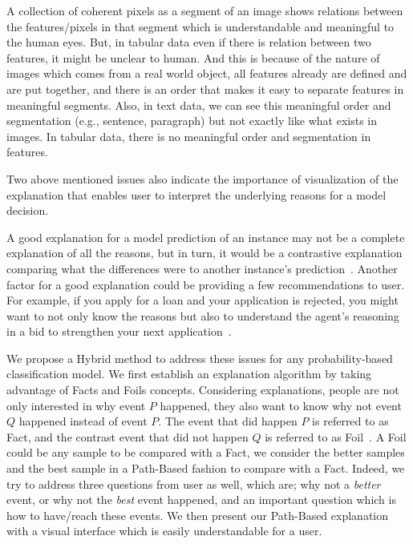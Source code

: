 \documentclass{llncs}
\begin{document}
A collection of coherent pixels as a segment of an image shows relations between the features/pixels in that segment which is understandable and meaningful to the human eyes. But, in tabular data even if there is relation between two features, it might be unclear to human. And this is because of the nature of images which comes from a real world object, all features already are defined and are put together, and there is an order that makes it easy to separate features in meaningful segments. Also, in text data, we can see this meaningful order and segmentation (e.g., sentence, paragraph) but not exactly like what exists in images. In tabular data, there is no meaningful order and segmentation in features.

Two above mentioned issues also indicate the importance of visualization of the explanation that enables user to interpret the underlying reasons for a model decision. 

A good explanation for a model prediction of an instance may not be a complete explanation of all the reasons, but in turn, it would be a contrastive explanation comparing what the differences were to another instance's prediction~\cite{molnar2020interpretable}.
Another factor for a good explanation could be providing a few recommendations to user. For example, if you apply for a loan and your application is rejected, you might want to not only know the reasons but also to understand the agent's reasoning in a bid to strengthen your next application~\cite{lipton2018mythos}.

We propose a Hybrid method to address these issues for any probability-based classification model. 
We first establish an explanation algorithm by taking advantage of Facts and Foils concepts. Considering explanations, people are not only interested in why event $P$ happened, they also want to know why not event $Q$ happened instead of event $P$. The event that did happen $P$ is referred to as Fact, and the contrast event that did not happen $Q$ is referred to as Foil~\cite{lipton2004inference}. %
A Foil could be any sample to be compared with a Fact, we consider the better samples and the best sample in a Path-Based fashion to compare with a Fact. Indeed, we try to address three questions from user as well, which are; why not a \textit{better} event, or why not the \textit{best} event happened, and an important question which is how to have/reach these events. We then present our Path-Based explanation with a visual interface which is easily understandable for a user.
\end{document}

